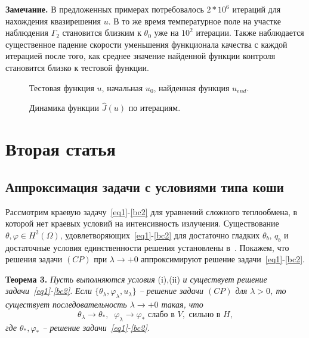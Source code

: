 \textbf{Замечание.} В предложенных примерах потребовалось $2*10^6$ итераций для нахождения квазирешения $u$.
В то же время температурное поле на участке наблюдения $\Gamma_2$ становится близким
к $\theta_0$ уже на $10^2$ итерации.
Также наблюдается существенное падение скорости уменьшения функционала качества с
каждой итерацией после того, как среднее значение найденной функции контроля
становится близко к тестовой функции.
\begin{figure}
    \centering
    \caption{Тестовая функция $u$, начальная $u_0$, найденная функция $u_{end}.$}
    \label{fig:control}
\end{figure}

\begin{figure}
    \centering
    \caption{Динамика функции $\hat{J}(u)$ по итерациям.}
    \label{fig:cost}
\end{figure}

\clearpage


\section{Вторая статья}\label{sec:ch3/sec2}

\subsection{Аппроксимация задачи с условиями типа коши}\label{subsec:ch3/3_1}
Рассмотрим краевую задачу~\eqref{eq1}-\eqref{bc2} для уравнений сложного теплообмена, в которой нет краевых условий на
интенсивность излучения.
Существование $\theta,\varphi\in H^2(\Omega)$, удовлетворяющих~\eqref{eq1}-\eqref{bc2}
для достаточно гладких
$\theta_b,\, q_b$ и достаточные условия единственности решения
установлены в~\cite{CMMP20}.
Покажем, что решения задачи $(CP)$ при $\lambda\to+0$
аппроксимируют решение задачи~\eqref{eq1}-\eqref{bc2}.


\textbf{Теорема 3.}
\textit{Пусть выполняются условия} (i),(ii) \textit{и существует решение задачи~\eqref{eq1}-\eqref{bc2}.}
        \textit{ Если $\{\theta_\lambda,\varphi_\lambda,u_\lambda\}$ -- решение
задачи $(CP)$ для $\lambda>0$, то существует последовательность
$\lambda\to +0$
такая, что}
\[
    \theta_\lambda\rightarrow\theta_*, \;\; \varphi_\lambda\rightarrow\varphi_*
    \text{ слабо в }V,\text{ сильно в }H,
\]
        \textit{где $\theta_*,\varphi_*$ -- решение задачи~\eqref{eq1}-\eqref{bc2}.}

